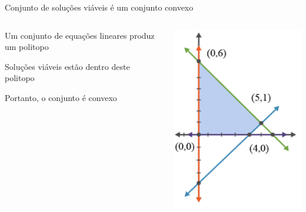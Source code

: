 \documentclass[compress,mathserif]{beamer}
\begin{document}
\begin{frame}{Conjunto de soluções viáveis é um conjunto convexo}

\begin{columns}[T]
    \begin{column}{.49\textwidth}
    
    \vspace{1cm}
    
    Um conjunto de equações lineares produz um politopo
    \vspace{1cm}    
    
    Soluções viáveis estão dentro deste politopo
    
    \vspace{1cm}    
    
    Portanto, o conjunto é convexo
    \end{column}
    \begin{column}{.49\textwidth}
        \centering\includegraphics[width=\linewidth]{images/modelo_pl.png}
    \end{column}
\end{columns}

\end{frame}
\end{document}
